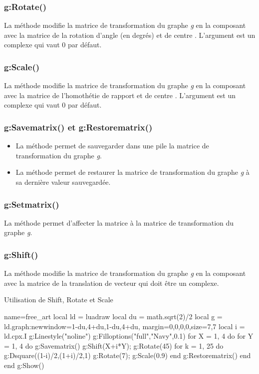 \subsubsection{g:Rotate()}
La méthode  modifie la matrice de transformation du graphe \emph g en la composant avec la matrice de la rotation d'angle  (en degrés) et de centre . L'argument  est un complexe qui vaut $0$ par défaut.

\subsubsection{g:Scale()}
La méthode  modifie la matrice de transformation du graphe \emph g en la composant avec la matrice de l'homothétie de rapport  et de centre . L'argument  est un complexe qui vaut $0$ par défaut.

\subsubsection{g:Savematrix() et g:Restorematrix()}
\begin{itemize}
    \item La méthode  permet de sauvegarder dans une pile la matrice de transformation du graphe \emph g.
    \item La méthode  permet de restaurer la matrice de transformation du graphe \emph g à sa dernière valeur sauvegardée.
\end{itemize}

\subsubsection{g:Setmatrix()}
La méthode  permet d'affecter la matrice  à la matrice de transformation du graphe \emph g.

\subsubsection{g:Shift()}
La méthode  modifie la matrice de transformation du graphe \emph g en la composant avec la matrice de la translation de vecteur  qui doit être un complexe.

\begin{demo}{Utilisation de Shift, Rotate et Scale}
\begin{luadraw}{name=free_art}
local ld = luadraw
local du = math.sqrt(2)/2
local g = ld.graph:new{window={1-du,4+du,1-du,4+du},
    margin={0,0,0,0},size={7,7}}
local i = ld.cpx.I
g:Linestyle("noline")
g:Filloptions("full","Navy",0.1)
for X = 1, 4 do
    for Y = 1, 4 do
        g:Savematrix()
        g:Shift(X+i*Y); g:Rotate(45)
        for k = 1, 25 do
            g:Dsquare((1-i)/2,(1+i)/2,1)
            g:Rotate(7); g:Scale(0.9)
        end
        g:Restorematrix()
    end
end
g:Show()
\end{luadraw}
\end{demo}

